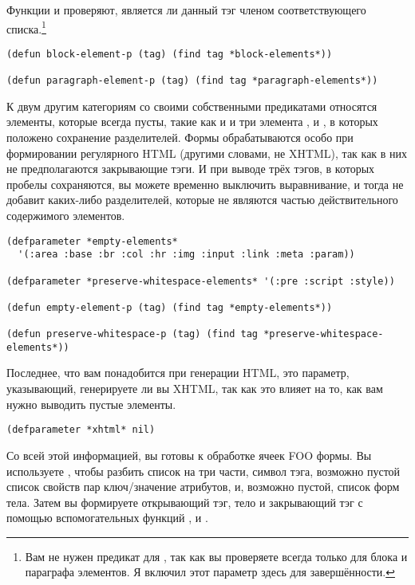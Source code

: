 Функции  и  проверяют, является ли данный
тэг членом соответствующего списка.\footnote{Вам не нужен предикат для
  , так как вы проверяете всегда только для блока и параграфа
  элементов. Я включил этот параметр здесь для завершённости.}

\begin{lstlisting}
(defun block-element-p (tag) (find tag *block-elements*))

(defun paragraph-element-p (tag) (find tag *paragraph-elements*))
\end{lstlisting}

К двум другим категориям со своими собственными предикатами относятся элементы, которые
всегда пусты, такие как  и  и три элемента ,  и
, в которых положено сохранение разделителей. Формы обрабатываются особо при
формировании регулярного HTML (другими словами, не XHTML), так как в них не предполагаются
закрывающие тэги. И при выводе трёх тэгов, в которых пробелы сохраняются, вы можете
временно выключить выравнивание, и тогда  не добавит каких-либо
разделителей, которые не являются частью действительного содержимого элементов.

\begin{lstlisting}
(defparameter *empty-elements*
  '(:area :base :br :col :hr :img :input :link :meta :param))

(defparameter *preserve-whitespace-elements* '(:pre :script :style))

(defun empty-element-p (tag) (find tag *empty-elements*))

(defun preserve-whitespace-p (tag) (find tag *preserve-whitespace-elements*))
\end{lstlisting}

Последнее, что вам понадобится при генерации HTML, это параметр, указывающий, генерируете
ли вы XHTML, так как это влияет на то, как вам нужно выводить пустые элементы.

\begin{lstlisting}
(defparameter *xhtml* nil)
\end{lstlisting}

Со всей этой информацией, вы готовы к обработке ячеек FOO формы. Вы используете
, чтобы разбить список на три части, символ тэга, возможно пустой
список свойств пар ключ/значение атрибутов, и, возможно пустой, список форм тела. Затем вы
формируете открывающий тэг, тело и закрывающий тэг с помощью вспомогательных функций
,  и .


